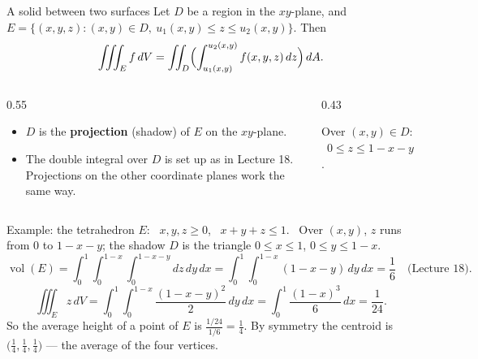 \documentclass[10pt]{wosm-slides}
\newcommand{\dA}{\, dA}
\newcommand{\dV}{\, dV}
\begin{document}
\begin{frame}{A solid between two surfaces}
  Let $D$ be a region in the $xy$-plane, and \
  $E = \{(x, y, z) : (x, y) \in D, \ u_1(x, y) \le z \le u_2(x, y)\}$. Then
  \[ \iiint_E f \dV = \iint_D \Bigl( \int_{u_1(x, y)}^{u_2(x, y)} f(x, y, z)\, dz \Bigr) \dA . \]
  \pause
  \begin{columns}[c]
    \begin{column}{0.55\textwidth}
      \begin{itemize}
        \item $D$ is the \textbf{projection} (shadow) of $E$ on the $xy$-plane.
        \item The double integral over $D$ is set up as in Lecture 18. Projections on the other
          coordinate planes work the same way.
      \end{itemize}
    \end{column}
    \begin{column}{0.43\textwidth}
      \centering
      \par\small Over $(x, y) \in D$: \ $0 \le z \le 1 - x - y$.
    \end{column}
  \end{columns}
\end{frame}

\begin{frame}{Example: the tetrahedron}
  $E$: \ $x, y, z \ge 0$, \ $x + y + z \le 1$. \ Over $(x, y)$, $z$ runs from $0$ to $1 - x - y$; the
  shadow $D$ is the triangle $0 \le x \le 1$, $0 \le y \le 1 - x$.
  \pause
  \[ \operatorname{vol}(E) = \int_0^1 \int_0^{1-x} \int_0^{1-x-y} dz\, dy\, dx
     = \int_0^1 \int_0^{1-x} (1 - x - y)\, dy\, dx = \frac16 \quad \text{(Lecture 18).} \]
  \pause
  \[ \iiint_E z \dV = \int_0^1 \int_0^{1-x} \frac{(1 - x - y)^2}{2}\, dy\, dx
     = \int_0^1 \frac{(1 - x)^3}{6}\, dx = \frac{1}{24} . \]
  \pause
  So the average height of a point of $E$ is $\frac{1/24}{1/6} = \frac14$. By symmetry the centroid is
  $\bigl(\frac14, \frac14, \frac14\bigr)$ --- the average of the four vertices.
\end{frame}
\end{document}

